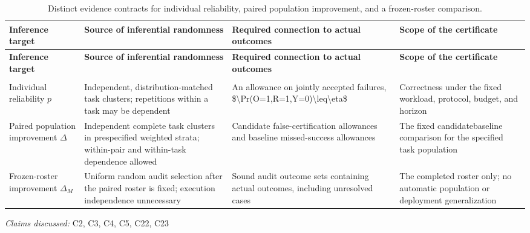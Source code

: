 \documentclass[11pt]{article}
\begin{document}
\begin{landscape}
\small
\begin{longtable}{@{}>{\raggedright\arraybackslash}p{}>{\raggedright\arraybackslash}p{}>{\raggedright\arraybackslash}p{}>{\raggedright\arraybackslash}p{}@{}}
\caption{Distinct evidence contracts for individual reliability, paired population improvement, and a frozen-roster comparison.}\\
\toprule
\textbf{Inference target} & \textbf{Source of inferential randomness} & \textbf{Required connection to actual outcomes} & \textbf{Scope of the certificate}\\
\midrule
\endfirsthead
\toprule
\textbf{Inference target} & \textbf{Source of inferential randomness} & \textbf{Required connection to actual outcomes} & \textbf{Scope of the certificate}\\
\midrule
\endhead
\midrule
\multicolumn{4}{r}{\footnotesize Continued on next page}\\
\endfoot
\bottomrule
\endlastfoot
Individual reliability $p$ & Independent, distribution-matched task clusters; repetitions within a task may be dependent & An allowance on jointly accepted failures, \$\textbackslash{}Pr(O=1,R=1,Y=0)\textbackslash{}leq\textbackslash{}eta\$ & Correctness under the fixed workload, protocol, budget, and horizon\\
Paired population improvement $\Delta$ & Independent complete task clusters in prespecified weighted strata; within-pair and within-task dependence allowed & Candidate false-certification allowances and baseline missed-success allowances & The fixed candidate\textendash{}baseline comparison for the specified task population\\
Frozen-roster improvement $\Delta_M$ & Uniform random audit selection after the paired roster is fixed; execution independence unnecessary & Sound audit outcome sets containing actual outcomes, including unresolved cases & The completed roster only; no automatic population or deployment generalization\\
\end{longtable}
\par{}
\end{landscape}
\textit{Claims discussed: }C2, C3, C4, C5, C22, C23
\end{document}
